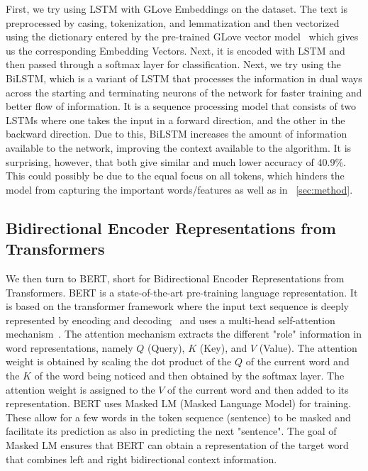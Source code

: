 \documentclass[11pt]{article}
\begin{document}
First, we try using LSTM with GLove Embeddings on the dataset. The text is preprocessed by casing, tokenization, and lemmatization and then vectorized using the dictionary entered by the pre-trained GLove vector model~\cite{glove} which gives us the corresponding Embedding Vectors. Next, it is encoded with LSTM and then passed through a softmax layer for classification. Next, we try using the BiLSTM, which is a variant of LSTM that processes the information in dual ways across the starting and terminating neurons of the network for faster training and better flow of information. It is a sequence processing model that consists of two LSTMs where one takes the input in a forward direction, and the other in the backward direction. Due to this, BiLSTM increases the amount of information available to the network, improving the context available to the algorithm. It is surprising, however, that both give similar and much lower accuracy of 40.9\%. This could possibly be due to the equal focus on all tokens, which hinders the model from capturing the important words/features as well as in ~\ref{sec:method}.

\subsection{Bidirectional Encoder Representations from Transformers}
\label{ssec:BERT}

We then turn to BERT, short for Bidirectional Encoder Representations from Transformers. BERT is a state-of-the-art pre-training language representation. It is based on the transformer framework where the input text sequence is deeply represented by encoding and decoding~\cite{devlin2018bert} and uses a multi-head self-attention mechanism~\cite{li2019exploiting}. The attention mechanism extracts the different "role" information in word representations, namely $Q$ (Query), $K$ (Key), and $V$ (Value). The attention weight is obtained by scaling the dot product of the $Q$ of the current word and the $K$ of the word being noticed and then obtained by the softmax layer. The attention weight is assigned to the $V$ of the current word and then added to its representation. BERT uses Masked LM (Masked Language Model) for training. These allow for a few words in the token sequence (sentence) to be masked and facilitate its prediction as also in predicting the next "sentence". The goal of Masked LM ensures that BERT can obtain a representation of the target word that combines left and right bidirectional context information. 
\end{document}
